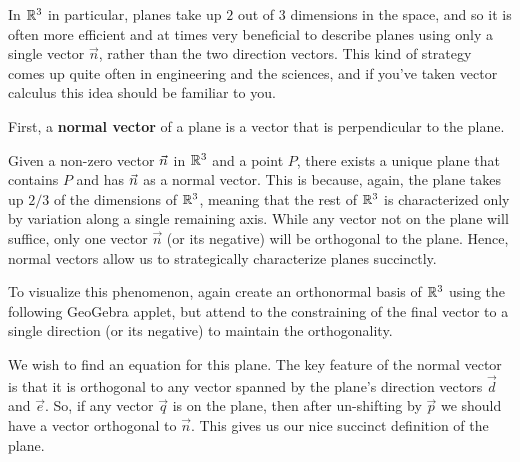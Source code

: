 \documentclass{ximera}
\begin{document}
In $\mathbb{R}^3$ in particular, planes take up $2$ out of $3$ dimensions in the space, and so it is often more efficient and at times very beneficial to describe planes using only a single vector $\vec{n}$, rather than the two direction vectors. This kind of strategy comes up quite often in engineering and the sciences, and if you've taken vector calculus this idea should be familiar to you.

First, a \textbf{normal vector} of a plane is a vector that is
perpendicular to the plane.
\begin{center}
\end{center}

Given a non-zero vector $\vec{n}$ in $\mathbb{R}^3$ and a point $P$, there
exists a unique plane that contains $P$ and has $\vec{n}$ as a normal
vector. This is because, again, the plane takes up $2/3$ of the dimensions of $\mathbb{R}^3$, meaning that the rest of $\mathbb{R}^3$ is characterized only by variation along a single remaining axis. While any vector not on the plane will suffice, only one vector $\vec{n}$ (or its negative) will be orthogonal to the plane. Hence, normal vectors allow us to strategically characterize planes succinctly.

To visualize this phenomenon, again create an orthonormal basis of $\mathbb{R}^3$ using the following GeoGebra applet, but attend to the constraining of the final vector to a single direction (or its negative) to maintain the orthogonality.

\begin{center}
\end{center}


We wish to find an equation for this plane. The key feature of the normal vector is that it is orthogonal to any vector spanned by the plane's direction vectors $\vec{d}$ and $\vec{e}$. So, if any vector $\vec{q}$ is on the plane, then after un-shifting by $\vec{p}$ we should have a vector orthogonal to $\vec{n}$. This gives us our nice succinct definition of the plane.
\end{document}
